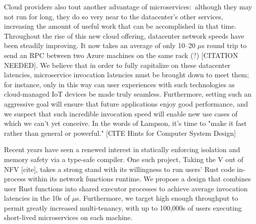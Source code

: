 Cloud providers also tout another advantage of microservices:\ although they may not run for long, they do so very near to the datacenter's other services, increasing the amount of useful work that can be accomplished in that time.
Throughout the rise of this new cloud offering, datacenter network speeds have been steadily improving.
It now takes an average of only 10--20 $\mu$s round trip to send an RPC between two Azure machines on the same rack (?) [CITATION NEEDED].
We believe that in order to fully capitalize on these datacenter latencies, microservice invocation latencies must be brought down to meet them; for instance, only in this way can user experiences with such technologies as cloud-managed IoT devices be made truly seamless.
Furthermore, setting such an aggressive goal will ensure that future applications enjoy good performance, and we suspect that such incredible invocation speed will enable new use cases of which we can't yet conceive.
In the words of Lampson, it's time to "make it fast rather than general or powerful." [CITE Hints for Computer System Design]

Recent years have seen a renewed interest in statically enforcing isolation and memory safety via a type-safe compiler.
One such project, Taking the V out of NFV [cite], takes a strong stand with its willingness to run users' Rust code in-process within its network functions runtime.
We propose a design that combines user Rust functions into shared executor processes to achieve average invocation latencies in the 10s of $\mu$s.
Furthermore, we target high enough throughput to permit greatly increased multi-tenancy, with up to 100,000s of users executing short-lived microservices on each machine.
